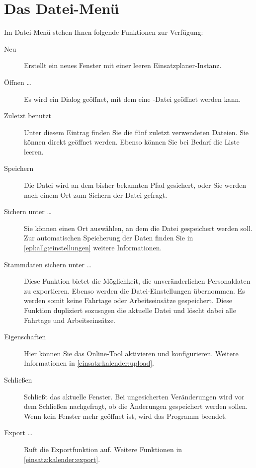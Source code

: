 \section{Das Datei-Menü}
Im Datei-Menü stehen Ihnen folgende Funktionen zur Verfügung:
\begin{description}
  \item[Neu]
  Erstellt ein neues Fenster mit einer leeren Einsatzplaner-Instanz.

  \item[Öffnen \dots]
  Es wird ein Dialog geöffnet, mit dem eine -Datei geöffnet werden kann.

  \item[Zuletzt benutzt]
  Unter diesem Eintrag finden Sie die fünf zuletzt verwendeten Dateien.
  Sie können direkt geöffnet werden.
  Ebenso können Sie bei Bedarf die Liste leeren.

  \item[Speichern]
  Die Datei wird an dem bisher bekannten Pfad gesichert, oder Sie werden nach einem Ort zum Sichern der Datei gefragt.

  \item[Sichern unter \dots]
  Sie können einen Ort auswählen, an dem die Datei gespeichert werden soll.
  Zur automatischen Speicherung der Daten finden Sie in \cref{epl:allg:einstellungen} weitere Informationen.

  \item[Stammdaten sichern unter \dots]
  Diese Funktion bietet die Möglichkeit, die unveränderlichen Personaldaten zu exportieren.
  Ebenso werden die Datei-Einstellungen übernommen.
  Es werden somit keine Fahrtage oder Arbeitseinsätze gespeichert.
  Diese Funktion dupliziert sozusagen die aktuelle Datei und löscht dabei alle Fahrtage und Arbeitseinsätze.


  \item[Eigenschaften]
  Hier können Sie das Online-Tool aktivieren und konfigurieren.
  Weitere Informationen in \cref{einsatz:kalender:upload}.

  \item[Schließen]
  Schließt das aktuelle Fenster.
  Bei ungesicherten Veränderungen wird vor dem Schließen nachgefragt, ob die Änderungen gespeichert werden sollen.
  Wenn kein Fenster mehr geöffnet ist, wird das Programm beendet.

  \item[Export \dots]
  Ruft die Exportfunktion auf.
  Weitere Funktionen in \cref{einsatz:kalender:export}.
\end{description}


